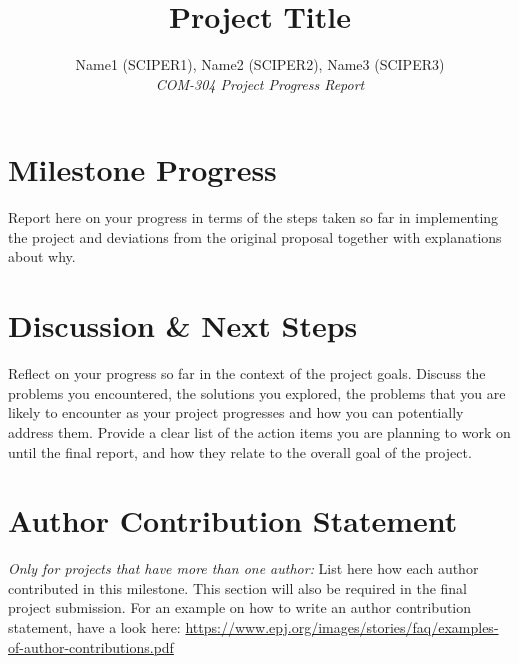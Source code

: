 \documentclass[10pt,conference,compsocconf]{IEEEtran}
\begin{document}
\title{Project Title}

\author{
  Name1 (SCIPER1), Name2 (SCIPER2), Name3 (SCIPER3)\\
  \textit{COM-304 Project Progress Report}
}

\maketitle


\section{Milestone Progress}
Report here on your progress in terms of the steps taken so far in implementing the project and deviations from the original proposal together with explanations about why.


\section{Discussion \& Next Steps}
Reflect on your progress so far in the context of the project goals. Discuss the problems you encountered, the solutions you explored, the problems that you are likely to encounter as your project progresses and how you can potentially address them. Provide a clear list of the action items you are planning to work on until the final report, and how they relate to the overall goal of the project.



\section{Author Contribution Statement}
\textit{Only for projects that have more than one author:}
List here how each author contributed in this milestone. This section will also be required in the final project submission. For an example on how to write an author contribution statement, have a look here: \url{https://www.epj.org/images/stories/faq/examples-of-author-contributions.pdf}


%
%
\end{document}
